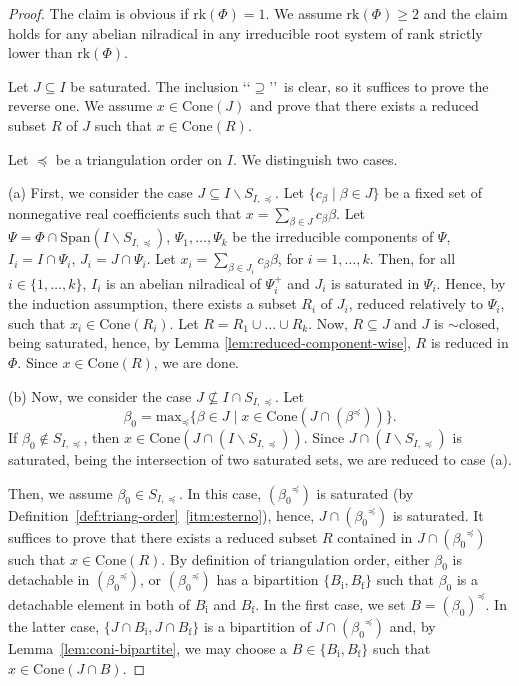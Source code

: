 \documentclass[ALCO,published]{cedram}
\theoremstyle{plain}
\newcommand\nl{\par\noindent}
\newcommand\smeno{\smallsetminus}
\newcommand\cone{\mathrm{Cone}}
\newcommand\gen{\mathrm{Span}}
\newcommand\rk{\mathrm{rk}}
\newcommand\be{\beta}
\newcommand\preq{\preccurlyeq}
\begin{document}
\begin{proof}
The claim is obvious if $\rk(\Phi)=1$.
We assume $\rk(\Phi)\geq 2$ and  the claim holds for any abelian nilradical in any irreducible root system of rank strictly lower than $\rk(\Phi)$.
\par
Let $J\subseteq I$ be saturated.
The inclusion \lq\lq$\supseteq$\rq\rq\ is clear, so it suffices to prove the reverse one.
We assume $x\in \cone(J)$ and prove that there exists a reduced subset $R$ of $J$ such that $x\in \cone(R)$. 

\par
Let $\preq$ be a triangulation order on $I$. We distinguish two cases.
\par

(a) First, we consider the case $J\subseteq I\smeno S_{I, \preq}$.
Let $\{c_\be\mid \be\in J\}$  be a fixed set of nonnegative real coefficients such that $x=\sum\limits_{\be\in  J} c_\be \be$. 
Let $\Psi=\Phi\cap  \gen(I\smeno S_{I,\preq})$, $\Psi_1,\dots, \Psi_k$ be the irreducible components of $\Psi$, $I_i=I\cap \Psi_i$, $J_i=J\cap \Psi_i$.
Let $x_i=\sum\limits_{\be\in J_i} c_{\be}\be$, for $i=1,\dots,k$.
Then,  for all $i\in \{1,\dots,k\}$,  $I_i$ is an abelian nilradical of $\Psi_i^+$ and $J_i$ is saturated in $\Psi_i$.
Hence, by the induction assumption, there exists a subset $R_i$ of $J_i$, reduced relatively to $\Psi_i$, such that $x_i\in \cone(R_i)$.
Let $R=R_1 \cup\dots\cup R_k$. 
Now, $R\subseteq J$ and $J$ is $\sim$closed, being saturated, hence, by Lemma \ref{lem:reduced-component-wise}, $R$ is reduced in $\Phi$. 
Since  $x\in \cone(R)$,  we are done.


(b) Now, we consider the case $J\not\subseteq I\cap S_{I, \preq}$.
Let  
$$\be_0=\mathrm{max}_\preq\{\be\in J\mid x\in \cone(J\cap(\be^\preq))\}.$$
If $\be_0\not\in S_{I, \preq}$, then $x\in \cone (J\cap(I\smeno S_{I, \preq}))$. 
Since $J\cap(I\smeno S_{I, \preq})$ is saturated, being the intersection of two saturated sets, we are reduced to case (a).

\par
Then, we assume $\be_0\in S_{I, \preq}$.
In this case, $({\be_0}^\preq)$ is saturated (by Definition~\ref{def:triang-order}~\ref{itm:esterno}), hence, $J\cap ({\be_0}^\preq)$ is saturated. 
It suffices to prove that there exists a reduced subset $R$ contained in $J\cap ({\be_0}^\preq)$ such that  $x\in \cone(R)$.
By definition of triangulation order, either $\be_0$ is detachable in  $({\be_0}^\preq)$, or $({\be_0}^\preq)$ has a bipartition $\{B_{\mathrm i}, B_{\mathrm f}\}$ such that $\be_0$ is a detachable element in both of $B_{\mathrm i}$ and $B_{\mathrm f}$. 
In the first case, we set $B=(\be_0)^\preq$. 
In the latter case,  $\{J\cap B_{\mathrm i}, J\cap B_{\mathrm f}\}$ is a bipartition of $J\cap ({\be_0}^\preq)$ and, by Lemma~\ref{lem:coni-bipartite}, we may choose a  $B\in\{B_{\mathrm i}, B_{\mathrm f}\}$ such that  $x\in \cone(J\cap B)$.


\end{proof}
\end{document}
